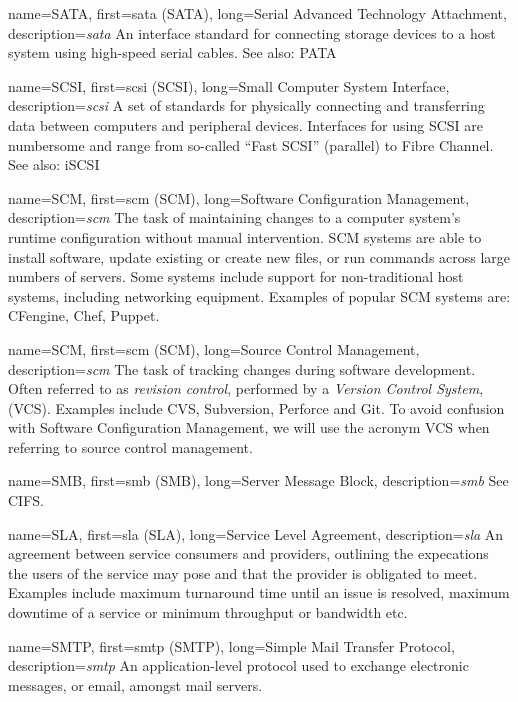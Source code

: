 {
	name={SATA},
	first={\acrlong{sata} (SATA)},
	long={Serial Advanced Technology Attachment},
	description={{\em \acrlong{sata}} An interface
standard for connecting storage devices to a host system using high-speed
serial cables.  See also: PATA}
}

{
	name={SCSI},
	first={\acrlong{scsi} (SCSI)},
	long={Small Computer System Interface},
	description={{\em \acrlong{scsi}} A set of standards for
physically connecting and transferring data between computers and
peripheral devices.  Interfaces for using SCSI are numbersome and range
from so-called ``Fast SCSI'' (parallel) to Fibre
Channel.  See also: iSCSI}
}

{
	name={SCM},
	first={\acrlong{scm} (SCM)},
	long={Software Configuration Management},
	description={{\em \acrlong{scm}} The task of maintaining
changes to a computer system's runtime configuration without manual
intervention.  SCM systems are able to install software, update existing
or create new files, or run commands across large numbers of servers.
Some systems include support for non-traditional host systems, including
networking equipment.  Examples of popular SCM systems are: CFengine,
Chef, Puppet.}
}

{
	name={SCM},
	first={\acrlong{scm} (SCM)},
	long={Source Control Management},
	description={{\em \acrlong{scm}} The task of tracking changes
during software development.  Often referred to as {\em revision control},
performed by a {\em Version Control System}, (VCS).  Examples include CVS,
Subversion, Perforce and Git. To avoid confusion with Software
Configuration Management, we will use the acronym VCS when referring to
source control management.}
}

{
	name={SMB},
	first={\acrlong{smb} (SMB)},
	long={Server Message Block},
	description={{\em \acrlong{smb}} See CIFS.}
}

{
	name={SLA},
	first={\acrlong{sla} (SLA)},
	long={Service Level Agreement},
	description={{\em \acrlong{sla}} An agreement between service
consumers and providers, outlining the expecations the users of the
service may pose and that the provider is obligated to meet.  Examples
include maximum turnaround time until an issue is resolved, maximum
downtime of a service or minimum throughput or
bandwidth etc.}
}

{
	name={SMTP},
	first={\acrlong{smtp} (SMTP)},
	long={Simple Mail Transfer Protocol},
	description={{\em \acrlong{smtp}} An application-level
protocol used to exchange electronic messages, or email, amongst mail
servers.}
}

